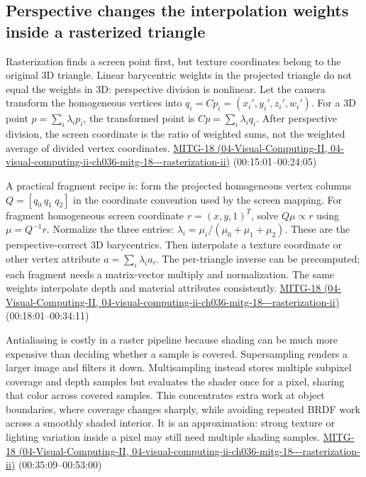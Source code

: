 \subsection{Perspective changes the interpolation weights inside a rasterized triangle}\label{03-visual-computing-i-ch015-perspective-changes-the-interpolation-weights-inside-a-rasterized-triangle}

Rasterization finds a screen point first, but texture coordinates belong to the original 3D triangle. Linear barycentric weights in the projected triangle do not equal the weights in 3D: perspective division is nonlinear. Let the camera transform the homogeneous vertices into \(q_i=Cp_i=(x_i',y_i',z_i',w_i')\). For a 3D point \(p=\sum_i\lambda_i p_i\), the transformed point is \(Cp=\sum_i\lambda_i q_i\). After perspective division, the screen coordinate is the ratio of weighted sums, not the weighted average of divided vertex coordinates. \href{../04-Visual-Computing-II/main.pdf\#nameddest=04-visual-computing-ii-ch036-mitg-18---rasterization-ii}{MITG-18 (04-Visual-Computing-II, 04-visual-computing-ii-ch036-mitg-18-\/-\/-rasterization-ii)} (00:15:01--00:24:05)

A practical fragment recipe is: form the projected homogeneous vertex columns \(Q=[q_0\ q_1\ q_2]\) in the coordinate convention used by the screen mapping. For fragment homogeneous screen coordinate \(r=(x,y,1)^T\), solve \(Q\mu\propto r\) using \(\mu=Q^{-1}r\). Normalize the three entries: \(\lambda_i=\mu_i/(\mu_0+\mu_1+\mu_2)\). These are the perspective-correct 3D barycentrics. Then interpolate a texture coordinate or other vertex attribute \(a=\sum_i\lambda_i a_i\). The per-triangle inverse can be precomputed; each fragment needs a matrix-vector multiply and normalization. The same weights interpolate depth and material attributes consistently. \href{../04-Visual-Computing-II/main.pdf\#nameddest=04-visual-computing-ii-ch036-mitg-18---rasterization-ii}{MITG-18 (04-Visual-Computing-II, 04-visual-computing-ii-ch036-mitg-18-\/-\/-rasterization-ii)} (00:18:01--00:34:11)

Antialiasing is costly in a raster pipeline because shading can be much more expensive than deciding whether a sample is covered. Supersampling renders a larger image and filters it down. Multisampling instead stores multiple subpixel coverage and depth samples but evaluates the shader once for a pixel, sharing that color across covered samples. This concentrates extra work at object boundaries, where coverage changes sharply, while avoiding repeated BRDF work across a smoothly shaded interior. It is an approximation: strong texture or lighting variation inside a pixel may still need multiple shading samples. \href{../04-Visual-Computing-II/main.pdf\#nameddest=04-visual-computing-ii-ch036-mitg-18---rasterization-ii}{MITG-18 (04-Visual-Computing-II, 04-visual-computing-ii-ch036-mitg-18-\/-\/-rasterization-ii)} (00:35:09--00:53:00)

